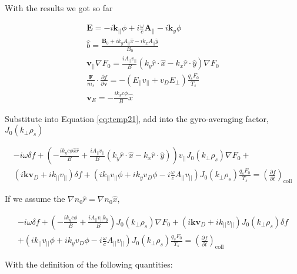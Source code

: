 With the results we got so far

\begin{eqnarray}
    \textbf{E}=-i\textbf{k}_{||}\phi +i\frac{\omega}{c} \textbf{A}_{||}-i\textbf{k}_{y}\phi\\
       \hat{b}= \frac{\textbf{B}_0+ik_yA_{||}\hat{x}-ik_xA_{||}\hat{y}
       }{B_0}\\
    \textbf{v}_{||}\nabla F_0=\frac{iA_{||}v_{||}}{B}\left(k_y\hat{r}\cdot\hat{x}-k_x\hat{r}\cdot\hat{y}\right)\nabla F_0\\
    \frac{\mathbf{F}}{m_s} \cdot \frac{\partial f}{\partial \mathbf{v}}{}=-(E_{||}v_{||}+v_D E_{\perp})\frac{q_sF_0}{T_s}\\
    \textbf{v}_{E}=-\frac{ik_yc\phi}{B}\hat{x}
\end{eqnarray}

Substitute into Equation \ref{eq:temp21}, add into the gyro-averaging factor, $J_0(k_\perp \rho_s)$

\begin{equation}\begin{aligned}
    -i\omega \delta f +
    \left(
    -\frac{ik_{y}c\phi\hat{x}\hat{r}}{B} 
    +\frac{iA_{||}v_{||}}{B}\left(k_y\hat{r}\cdot\hat{x}-k_x\hat{r}\cdot\hat{y}\right)
    \right)
    v_{||}J_0(k_\perp \rho_s)\nabla F_0 
    +\\
    (i\textbf{kv}_D 
    + ik_{||}v_{||})\delta f
    +(ik_{||}v_{||}\phi+ik_yv_D\phi -i\frac{\omega}{c} A_{||}v_{||})J_0(k_\perp \rho_s)\frac{q_sF_0}{T_s}
    =\left(\frac{\partial f}{\partial t}\right)_{\mathrm{coll}}
    \label{eq:temp22}
\end{aligned}\end{equation}

If we assume the $\nabla n_0 \hat{r}=\nabla n_0 \hat{x}$,

\begin{equation}\begin{aligned}
    -i\omega \delta f +
    \left(
    -\frac{ik_{y}c\phi}{B} 
    +\frac{iA_{||}v_{||}k_y}{B}
    \right)J_0(k_\perp \rho_s)
    \nabla F_0 
    +
    (i\textbf{kv}_D 
    + ik_{||}v_{||})J_0(k_\perp \rho_s)\delta f\\
    +(ik_{||}v_{||}\phi+ik_yv_D\phi -i\frac{\omega}{c} A_{||}v_{||})J_0(k_\perp \rho_s)\frac{q_sF_0}{T_s}
    =\left(\frac{\partial f}{\partial t}\right)_{\mathrm{coll}}
    \label{eq:temp22}
\end{aligned}\end{equation}

With the definition of the following quantities:

